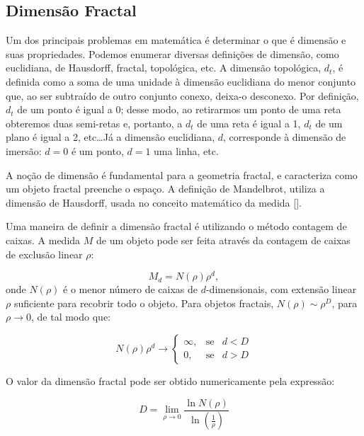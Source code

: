 \documentclass[brazil,ruledheader]{abnt}
\renewcommand{\cite}[1]{[\citeonline{#1}]}
\begin{document}
\subsection{Dimensão Fractal}

Um dos principais problemas em matemática é determinar o que é dimensão e suas
propriedades. Podemos enumerar diversas definições de dimensão, como euclidiana,
de
Hausdorff, fractal, topológica, etc. A dimensão topológica, $d_t$, é definida
como a soma de uma unidade à dimensão euclidiana do menor conjunto que, ao ser
subtraído de
outro conjunto conexo, deixa-o desconexo. Por definição, $d_t$ de um ponto é
igual a 0; desse modo, ao retirarmos um ponto de uma reta obteremos duas
semi-retas e, portanto, a $d_t$ de uma reta é igual a 1, $d_t$ de um plano é
igual a 2, etc\dots Já a dimensão euclidiana, $d$, corresponde à dimensão de
imersão: $d=0$ é um ponto, $d=1$ uma linha, etc.

A noção de dimensão é fundamental para a geometria fractal, e caracteriza
 como um objeto fractal preenche o espaço. A definição de Mandelbrot,
utiliza a dimensão de Hausdorff, usada no conceito matemático da medida
\cite{Fa03}.

Uma maneira de definir a dimensão fractal é utilizando o método contagem de
caixas. A medida $M$ de um objeto pode
ser feita através da contagem de caixas de exclusão linear $\rho$:

\begin{equation}
\label{eq:contagem-caixas}
M_d=N(\rho)\rho^d,
\end{equation}
onde $N(\rho)$ é o menor número de caixas de $d$-dimensionais, com extensão
linear $\rho$ suficiente para recobrir todo o objeto. Para objetos fractais, 
$N(\rho)\sim \rho^D$, para $\rho \rightarrow 0$, de tal modo que:

\begin{equation}
\label{eq:contagem-caixas2}
N(\rho)\rho^d\rightarrow \left\{\begin{array}{rcl} \infty, & \mbox{se} & d<D \\
0, & \mbox{se} & d>D
\end{array}\right.
\end{equation}

O valor da dimensão fractal pode ser obtido numericamente pela expressão:

\begin{equation}
\label{eq:contagem-caixas3}
D=\lim_{\rho \rightarrow 0}\frac{\ln N(\rho)}{\ln (\frac{1}{\rho})}
\end{equation}
\end{document}
